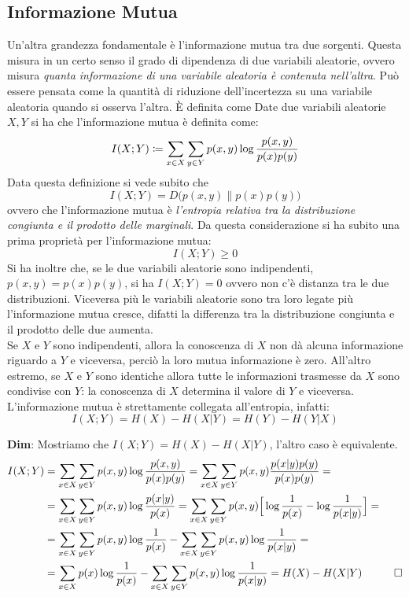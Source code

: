 \subsection{Informazione Mutua}
Un'altra grandezza fondamentale \`e l'informazione mutua tra due sorgenti. Questa misura in un certo senso il grado di dipendenza di due variabili aleatorie, ovvero misura \textit{quanta informazione di una variabile aleatoria \`e contenuta nell'altra}. Pu\`o essere pensata come la quantit\`a di riduzione dell'incertezza su una variabile aleatoria quando si osserva l'altra. \`E definita come
 Date due variabili aleatorie $X, Y$ si ha che l'informazione mutua \`e definita come:
\begin{equation}
    I(X;Y) \coloneqq \sum_{x \in X} \sum_{y \in Y} p(x,y) \log \frac{p(x,y)}{p(x)p(y)}
\end{equation} 
Data questa definizione si vede subito che
\begin{equation}
    I(X;Y) = D \Big ( p(x,y) \| p(x)p(y) \Big )
\end{equation}
ovvero che l'informazione mutua \`e \textit{l'entropia relativa tra la distribuzione congiunta e il prodotto delle marginali}. Da questa considerazione si ha subito una prima propriet\`a per l'informazione mutua:
\begin{equation}
    I(X;Y) \geq 0
\end{equation}
Si ha inoltre che, se le due variabili aleatorie sono indipendenti, $p(x,y) = p(x)p(y)$, si ha $I(X;Y) = 0$ ovvero non c'\`e distanza tra le due distribuzioni. Viceversa più le variabili aleatorie sono tra loro legate più l’informazione mutua cresce, difatti la differenza tra la distribuzione congiunta e il prodotto delle due aumenta. \\
Se $X$ e $Y$ sono indipendenti, allora la conoscenza di $X$ non dà alcuna informazione riguardo a $Y$ e viceversa, perciò la loro mutua informazione è zero. All'altro estremo, se $X$ e $Y$ sono identiche allora tutte le informazioni trasmesse da $X$ sono condivise con $Y$: la conoscenza di $X$ determina il valore di $Y$ e viceversa.\\
L’informazione mutua è strettamente collegata all’entropia, infatti:
\begin{equation}
    I(X;Y) = H(X) - H(X|Y) = H(Y) - H(Y|X)
\end{equation}
\begin{tcolorbox}
\textbf{Dim}: Mostriamo che $I(X;Y) = H(X) - H(X|Y)$, l'altro caso \`e equivalente.
\begin{align*}
    I(X;Y) &= \sum_{x \in X} \sum_{y \in Y} p(x,y) \log \frac{p(x,y)}{p(x)p(y)} = \sum_{x \in X} \sum_{y \in Y} p(x,y) \frac{p(x|y)p(y)}{p(x)p(y)} = \\
    &= \sum_{x \in X} \sum_{y \in Y} p(x,y) \log \frac{p(x|y)}{p(x)} = \sum_{x \in X} \sum_{y \in Y} p(x,y) \Big [ \log \frac{1}{p(x)} - \log \frac{1}{p(x|y)} \Big ] = \\
    &= \sum_{x \in X} \sum_{y \in Y} p(x,y) \log \frac{1}{p(x)} - \sum_{x \in X} \sum_{y \in Y} p(x,y) \log \frac{1}{p(x|y)} =\\ 
    & = \sum_{x \in X} p(x) \log \frac{1}{p({x})} - \sum_{x \in X} \sum_{y \in Y} p(x,y) \log \frac {1}{p(x|y)} = H(X) - H(X|Y) \hspace{30pt} \square
\end{align*}
\end{tcolorbox}
